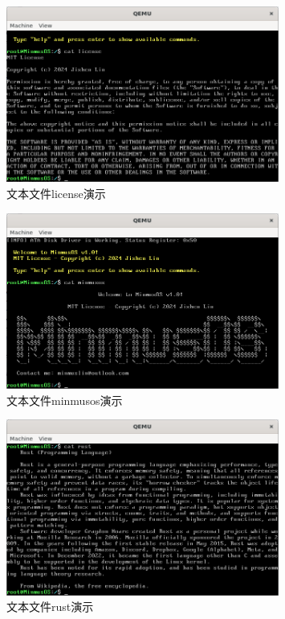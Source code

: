\begin{figure}[htbp]
    \centering
    \includegraphics[width=0.8\textwidth]{figures/LicenseFilePresentation.png}
    \caption{文本文件license演示}
    \label{fig:LicenseFilePresentation}
\end{figure}

\begin{figure}[htbp]
    \centering
    \includegraphics[width=0.8\textwidth]{figures/MinmusOSFilePresentation.png}
    \caption{文本文件minmusos演示}
    \label{fig:MinmusOSFilePresentation}
\end{figure}

\begin{figure}[htbp]
    \centering
    \includegraphics[width=0.8\textwidth]{figures/RustFilePresentation.png}
    \caption{文本文件rust演示}
    \label{fig:RustFilePresentation}
\end{figure}

